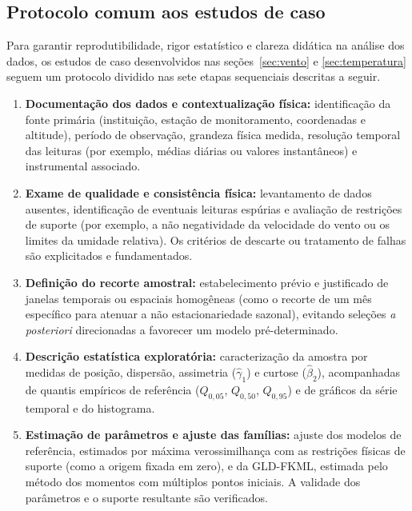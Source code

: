 \subsection{Protocolo comum aos estudos de caso}\label{subsec:protocolo}

Para garantir reprodutibilidade, rigor estatístico e clareza didática na análise dos dados, os estudos de caso desenvolvidos nas seções~\ref{sec:vento} e \ref{sec:temperatura} seguem um protocolo dividido nas sete etapas sequenciais descritas a seguir.

\begin{enumerate}
    \item \textbf{Documentação dos dados e contextualização física:} identificação da fonte primária (instituição, estação de monitoramento, coordenadas e altitude), período de observação, grandeza física medida, resolução temporal das leituras (por exemplo, médias diárias ou valores instantâneos) e instrumental associado.

    \item \textbf{Exame de qualidade e consistência física:} levantamento de dados ausentes, identificação de eventuais leituras espúrias e avaliação de restrições de suporte (por exemplo, a não negatividade da velocidade do vento ou os limites da umidade relativa). Os critérios de descarte ou tratamento de falhas são explicitados e fundamentados.

    \item \textbf{Definição do recorte amostral:} estabelecimento prévio e justificado de janelas temporais ou espaciais homogêneas (como o recorte de um mês específico para atenuar a não estacionariedade sazonal), evitando seleções \textit{a posteriori} direcionadas a favorecer um modelo pré-determinado.

    \item \textbf{Descrição estatística exploratória:} caracterização da amostra por medidas de posição, dispersão, assimetria ($\widehat\gamma_1$) e curtose ($\widehat\beta_2$), acompanhadas de quantis empíricos de referência ($Q_{0,05}$, $Q_{0,50}$, $Q_{0,95}$) e de gráficos da série temporal e do histograma.

    \item \textbf{Estimação de parâmetros e ajuste das famílias:} ajuste dos modelos de referência, estimados por máxima verossimilhança com as restrições físicas de suporte (como a origem fixada em zero), e da GLD-FKML, estimada pelo método dos momentos com múltiplos pontos iniciais. A validade dos parâmetros e o suporte resultante são verificados.


\end{enumerate}
